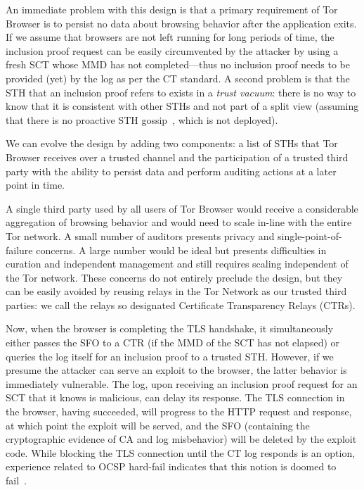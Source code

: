 An immediate problem with this design is that a primary requirement of Tor
Browser is to persist no data about browsing behavior after the application
exits. If we assume that browsers are not left running for long periods of time,
the inclusion proof request can be easily circumvented by the attacker by using
a fresh SCT whose MMD has not completed---thus no inclusion proof needs to be
provided (yet) by the log as per the CT standard. A second problem is that the
STH that an inclusion proof refers to exists in a \emph{trust vacuum}:
	there is no way to know that it is consistent with other STHs and not part
	of a split view (assuming that there is no proactive STH
	gossip~\cite{syta,dahlberg}, which is not deployed).

We can evolve the design by adding two components: a list of STHs that Tor
Browser receives over a trusted channel and the participation of a trusted third
party with the ability to persist data and perform auditing actions at a later
point in time.

A single third party used by all users of Tor Browser would receive a
considerable aggregation of browsing behavior and would need to scale in-line
with the entire Tor network. A small number of auditors presents privacy and
single-point-of-failure concerns. A large number would be ideal but presents
difficulties in curation and independent management and still requires scaling
independent of the Tor network. These concerns do not entirely preclude the
design, but they can be easily avoided by reusing relays in the Tor Network as
our trusted third parties: we call the relays so designated Certificate
Transparency Relays (CTRs).

Now, when the browser is completing the TLS handshake, it simultaneously either
passes the SFO to a CTR (if the MMD of the SCT has not elapsed) or queries the
log itself for an inclusion proof to a trusted STH\@.  However, if we presume
the attacker can serve an exploit to the browser, the latter behavior is
immediately vulnerable. The log, upon receiving an inclusion proof request for
an SCT that it knows is malicious, can delay its response. The TLS connection in
the browser, having succeeded, will progress to the HTTP request and response,
at which point the exploit will be served, and the SFO (containing the
cryptographic evidence of CA and log misbehavior) will be deleted by the exploit
code. While blocking the TLS connection until the CT log responds is an option,
experience related to OCSP hard-fail indicates that this notion is doomed to
fail~\cite{no-hard-fail}.


